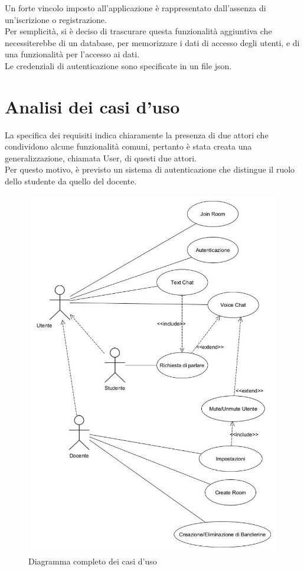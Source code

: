 Un forte vincolo imposto all'applicazione è rappresentato dall'assenza di un'iscrizione o registrazione.\\ Per semplicità, si è deciso di trascurare questa funzionalità aggiuntiva che necessiterebbe di un \gls{database}, per memorizzare i dati di accesso degli utenti, e di una funzionalità per l'accesso ai dati.
\\Le credenziali di autenticazione sono specificate in un file json.
\section{Analisi dei casi d'uso}
La specifica dei requisiti indica chiaramente la presenza di due attori che
condividono alcune funzionalità comuni, pertanto è stata creata una generalizzazione,
chiamata User, di questi due attori.
\\Per questo motivo, è previsto un sistema di autenticazione che distingue il ruolo dello studente da quello del docente.
\begin{figure}[H]
    \centering
    \includegraphics[width = 13cm, height = 16cm]{Immagini/AppUseCase (complete).jpg}
    \caption{Diagramma completo dei casi d'uso }
    \label{fig:my_label}
\end{figure} 
